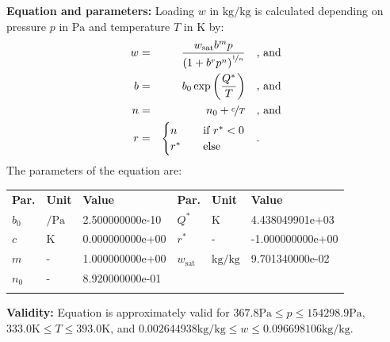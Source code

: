\textbf{Equation and parameters:}
\newline
%
Loading $w$ in $\si{\kilogram\per\kilogram}$ is calculated depending on pressure $p$ in $\si{\pascal}$ and temperature $T$ in $\si{\kelvin}$ by:
%
\begin{equation*}
\begin{split}
w &=& \frac{w_\mathrm{sat} b^{m} p}{\left( 1 + b^{r} p^{n} \right)^{\nicefrac{1}{n}}} & \quad\text{, and} \\
b &=& b_0 \exp\left( \frac{Q^{*}}{T} \right) & \quad\text{, and} \\
n &=& n_0 + \nicefrac{c}{T} & \quad\text{, and} \\
r &=& \begin{cases} n & \quad \text{if } r^{*} < 0 \\ r^{*}  & \quad \text{else} \end{cases} & \quad\text{.}
\end{split}
\end{equation*}
%
The parameters of the equation are:
%
\begin{longtable}[l]{lll|lll}
\toprule
\addlinespace
\textbf{Par.} & \textbf{Unit} & \textbf{Value} &	\textbf{Par.} & \textbf{Unit} & \textbf{Value} \\
\addlinespace
\midrule
\endhead

\bottomrule
\endfoot
\bottomrule
\endlastfoot
\addlinespace

$b_0$ & $\si{\per\pascal}$ & 2.500000000e-10 & $Q^{*}$ & $\si{\kelvin}$ & 4.438049901e+03 \\
$c$ & $\si{\kelvin}$ & 0.000000000e+00 & $r^{*}$ & - & -1.000000000e+00 \\
$m$ & - & 1.000000000e+00 & $w_\mathrm{sat}$ & $\si{\kilogram\per\kilogram}$ & 9.701340000e-02 \\
$n_0$ & - & 8.920000000e-01 & & & \\

\addlinespace\end{longtable}

\textbf{Validity:}
\newline
Equation is approximately valid for $367.8 \si{\pascal} \leq p \leq 154298.9 \si{\pascal}$,  $333.0 \si{\kelvin} \leq T \leq 393.0 \si{\kelvin}$, and $0.002644938 \si{\kilogram\per\kilogram} \leq w \leq 0.096698106 \si{\kilogram\per\kilogram}$.
\newline

